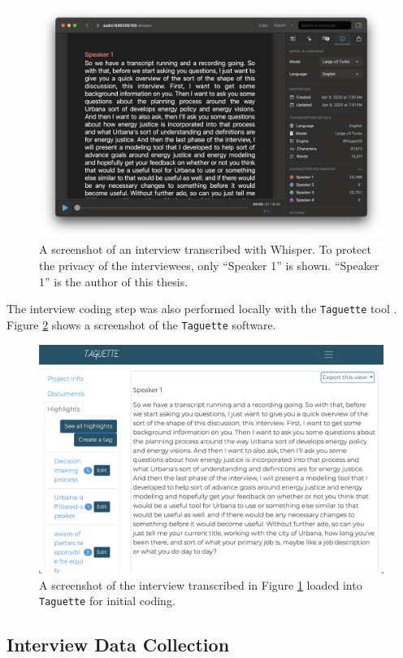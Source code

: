 \begin{figure}[htbp!]
    \centering
    \includegraphics[width=0.75\columnwidth]{figures/07_interview_chapter/whisper-screenshot.png}
    \caption{A screenshot of an interview transcribed with Whisper. To protect
    the privacy of the interviewees, only ``Speaker 1'' is shown. ``Speaker 1''
    is the author of this thesis.}
    \label{fig:whisper}
\end{figure}


The interview coding step was also performed locally with the \texttt{Taguette}
tool \cite{rampin_taguette_2021}. Figure \ref{fig:taguette} shows a screenshot
of the \texttt{Taguette} software.

\begin{figure}[htbp!]
    \centering
    \includegraphics[width=0.75\columnwidth]{figures/07_interview_chapter/taguette-screenshot}
    \caption{A screenshot of the interview transcribed in Figure \ref{fig:whisper}
    loaded into \texttt{Taguette} for initial coding.}
    \label{fig:taguette}
\end{figure}

\subsection{Interview Data Collection}

